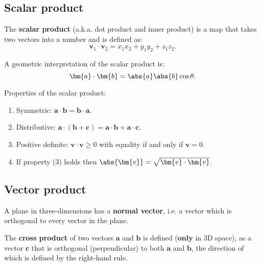 \documentclass[12pt, a4paper]{article}
\begin{document}
\subsection{Scalar product}

\begin{definition}
    The \textbf{scalar product} (a.k.a. dot product and inner product) is a map that takes two vectors into a number and is defined as:
    \[\bm{v}_1 \cdot \bm{v}_2 = x_1x_2+y_1y_2+z_1z_2.\]
\end{definition}

\begin{theorem}
    A geometric interpretation of the scalar product is:
    \[\bm{a}\cdot \bm{b}= \abs{a}\abs{b}\cos\theta.\]
\end{theorem}

\begin{mdthm}
    Properties of the scalar product:
    \begin{enumerate}
        \item Symmetric: \(\bm{a} \cdot \bm{b} = \bm{b}\cdot \bm{a}\).
        \item Distributive: \(\bm{a} \cdot (\bm{b}+\bm{c}) = \bm{a} \cdot \bm{b} +\bm{a} \cdot \bm{c}\).
        \item Positive definite: \(\bm{v}\cdot \bm{v} \geq 0\) with equality if and only if \(\bm{v}=0\).
        \item If property (3) holds then \(\abs{\bm{v}}=\sqrt{\bm{v}\cdot \bm{v}}\).
    \end{enumerate}
\end{mdthm}

\subsection{Vector product}

\begin{theorem}
    A plane in three-dimensions has a \textbf{normal vector}, i.e. a vector which is orthogonal to every vector in the plane.
\end{theorem}

\begin{definition}
    The \textbf{cross product} of two vectors \(\bm{a}\) and \(\bm{b}\) is defined (\textbf{only} in 3D space), as a vector \(\bm{c}\) that is orthogonal (perpendicular) to both \(\bm{a}\) and \(\bm{b}\), the direction of which is defined by the right-hand rule.
\end{definition}
\end{document}
